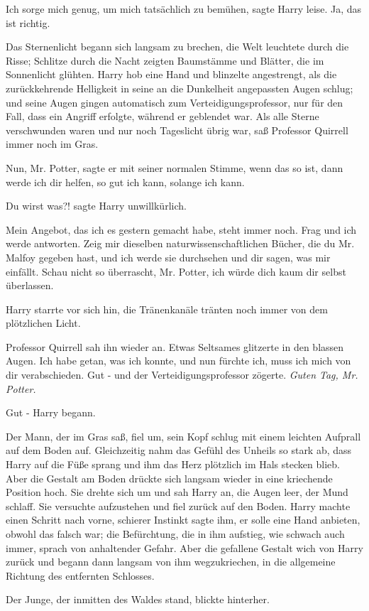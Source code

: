 \glqq{}Ich sorge mich genug, um mich tatsächlich zu bemühen\grqq{}, sagte Harry
leise. \glqq{}Ja, das ist richtig.\grqq{}

Das Sternenlicht begann sich langsam zu brechen, die Welt leuchtete durch die
Risse; Schlitze durch die Nacht zeigten Baumstämme und Blätter, die im
Sonnenlicht glühten. Harry hob eine Hand und blinzelte angestrengt, als die
zurückkehrende Helligkeit in seine an die Dunkelheit angepassten Augen schlug;
und seine Augen gingen automatisch zum Verteidigungsprofessor, nur für den Fall,
dass ein Angriff erfolgte, während er geblendet war. Als alle Sterne
verschwunden waren und nur noch Tageslicht übrig war, saß Professor Quirrell
immer noch im Gras.

\glqq{}Nun, Mr. Potter\grqq{}, sagte er mit seiner normalen Stimme, \glqq{}wenn
das so ist, dann werde ich dir helfen, so gut ich kann, solange ich kann.\grqq{}

\glqq{}Du wirst was?!\grqq{} sagte Harry unwillkürlich.

\glqq{}Mein Angebot, das ich es gestern gemacht habe, steht immer noch. Frag und
ich werde antworten. Zeig mir dieselben naturwissenschaftlichen Bücher, die du
Mr. Malfoy gegeben hast, und ich werde sie durchsehen und dir sagen, was mir
einfällt. Schau nicht so überrascht, Mr. Potter, ich würde dich kaum dir selbst
überlassen.\grqq{}

Harry starrte vor sich hin, die Tränenkanäle tränten noch immer von dem
plötzlichen Licht.

Professor Quirrell sah ihn wieder an. Etwas Seltsames glitzerte in den blassen
Augen. \glqq{}Ich habe getan, was ich konnte, und nun fürchte ich, muss ich mich
von dir verabschieden. Gut -\grqq{} und der Verteidigungsprofessor zögerte.
\glqq{}\emph{Guten Tag, Mr. Potter.}\grqq{}

\glqq{}Gut -\grqq{} Harry begann.

Der Mann, der im Gras saß, fiel um, sein Kopf schlug mit einem leichten Aufprall
auf dem Boden auf. Gleichzeitig nahm das Gefühl des Unheils so stark ab, dass
Harry auf die Füße sprang und ihm das Herz plötzlich im Hals stecken blieb. Aber
die Gestalt am Boden drückte sich langsam wieder in eine kriechende Position
hoch. Sie drehte sich um und sah Harry an, die Augen leer, der Mund schlaff. Sie
versuchte aufzustehen und fiel zurück auf den Boden. Harry machte einen Schritt
nach vorne, schierer Instinkt sagte ihm, er solle eine Hand anbieten, obwohl das
falsch war; die Befürchtung, die in ihm aufstieg, wie schwach auch immer, sprach
von anhaltender Gefahr. Aber die gefallene Gestalt wich von Harry zurück und
begann dann langsam von ihm wegzukriechen, in die allgemeine Richtung des
entfernten Schlosses.

Der Junge, der inmitten des Waldes stand, blickte hinterher.

